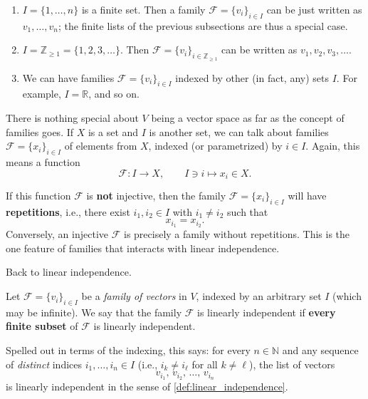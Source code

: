 \begin{example}
\label{ex:families}
\begin{enumerate}[label=\textbf{(\arabic*)}]
    \item $I = \{1, \dots, n\}$ is a finite set. Then a family $\mathcal{F} = \{v_i\}_{i \in I}$ can be just written as $v_1, \dots, v_n$; the finite lists of the previous subsections are thus a special case.
    \item $I = \mathbb{Z}_{\ge 1} = \{1, 2, 3, \dots\}$. Then $\mathcal{F} = \{v_i\}_{i \in \mathbb{Z}_{\ge 1}}$ can be written as $v_1, v_2, v_3, \dots$.
    \item We can have families $\mathcal{F} = \{v_i\}_{i \in I}$ indexed by other (in fact, any) sets $I$. For example, $I = \mathbb{R}$, and so on.
\end{enumerate}
\end{example}

\begin{remark}
\label{rem:families_of_any_set}
There is nothing special about $V$ being a vector space as far as the concept of families goes. If $X$ is a set and $I$ is another set, we can talk about families $\mathcal{F} = \{x_i\}_{i \in I}$ of elements from $X$, indexed (or parametrized) by $i \in I$. Again, this means a function
\[
\mathcal{F} \colon I \longrightarrow X, \qquad I \ni i \longmapsto x_i \in X.
\]
\end{remark}

\begin{remark}
\label{rem:family_repetitions}
If this function $\mathcal{F}$ is \textbf{not} injective, then the family $\mathcal{F} = \{x_i\}_{i \in I}$ will have \textbf{repetitions}, i.e., there exist $i_1, i_2 \in I$ with $i_1 \ne i_2$ such that
\[
x_{i_1} = x_{i_2}.
\]
Conversely, an injective $\mathcal{F}$ is precisely a family without repetitions. This is the one feature of families that interacts with linear independence.
\end{remark}

Back to linear independence.

\begin{definition}
\label{def:independent_family}
Let $\mathcal{F} = \{v_i\}_{i \in I}$ be a \textit{family of vectors} in $V$, indexed by an arbitrary set $I$ (which may be infinite). We say that the family $\mathcal{F}$ is linearly independent if \textbf{every finite subset} of $\mathcal{F}$ is linearly independent.

Spelled out in terms of the indexing, this says: for every $n \in \mathbb{N}$ and any sequence of \emph{distinct} indices $i_1, \dots, i_n \in I$ (i.e., $i_k \ne i_\ell$ for all $k \ne \ell$), the list of vectors
\[
v_{i_1}, \, v_{i_2}, \, \dots, \, v_{i_n}
\]
is linearly independent in the sense of \cref{def:linear_independence}.
\end{definition}

